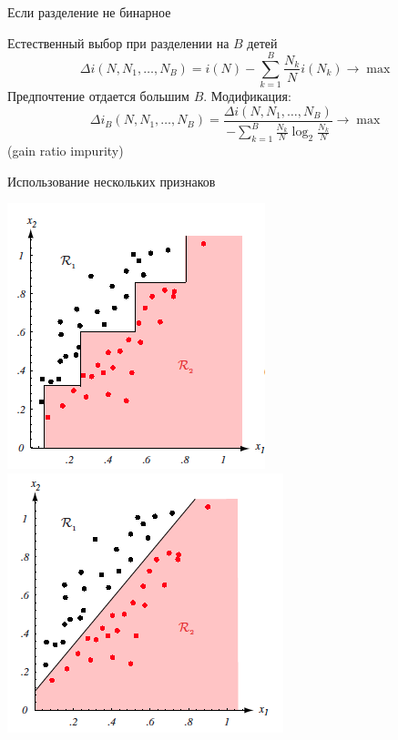 \documentclass[10pt]{beamer}
\begin{document}

\begin{frame}{Если разделение не бинарное}

Естественный выбор при разделении на $B$ детей
\[
\Delta i(N, N_1, \ldots, N_B) = i(N) - \sum_{k=1}^B \frac{N_k}{N} i(N_k) \rightarrow \max
\]
Предпочтение отдается большим $B$. Модификация:
\[
\Delta i_B(N, N_1, \ldots, N_B) = \frac{\Delta i(N, N_1, \ldots, N_B)}{-\sum_{k=1}^B \frac{N_k}{N} \log_2 \frac{N_k}{N}} \rightarrow \max
\]
(gain ratio impurity)

\end{frame}


\begin{frame}{Использование нескольких признаков}

\begin{center}
\includegraphics[scale=0.45]{images/multi1.png}\;
\includegraphics[scale=0.45]{images/multi2.png}
\end{center}

\end{frame}
\end{document}
